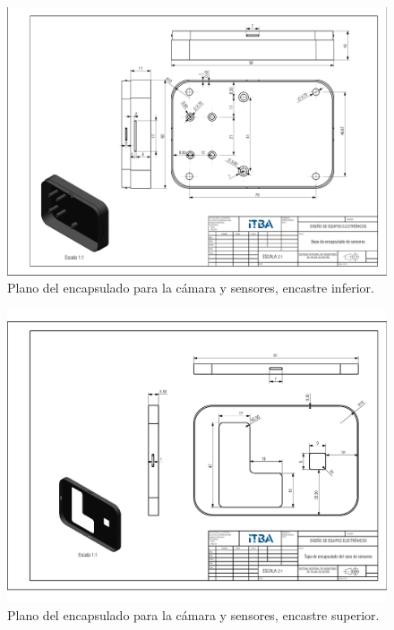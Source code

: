 \begin{figure}[H]
	\centering
	\includegraphics[width=\linewidth]{ImagenesApendice/BasePlano}
	\caption{Plano del encapsulado para la cámara y sensores, encastre inferior.}
	\label{fig:BasePlano}
\end{figure}

\begin{figure}[H]
	\centering
	\includegraphics[width=\linewidth]{ImagenesApendice/TapaPlano}
	\caption{Plano del encapsulado para la cámara y sensores, encastre superior.}
	\label{fig:TapaPlano}
\end{figure}


